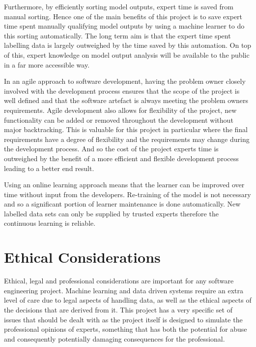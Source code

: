 \documentclass{ecmm427_assignment}
\begin{document}
Furthermore, by efficiently sorting model outputs, expert time is saved from manual sorting. Hence one of the main benefits of this project is to save expert time spent manually qualifying model outputs by using a machine learner to do this sorting automatically. The long term aim is that the expert time spent labelling data is largely outweighed by the time saved by this automation. On top of this, expert knowledge on model output analysis will be available to the public in a far more accessible way.\par

In an agile approach to software development, having the problem owner closely involved with the development process ensures that the scope of the project is well defined and that the software artefact is always meeting the problem owners requirements. Agile development also allows for flexibility of the project, new functionality can be added or removed throughout the development without major backtracking. This is valuable for this project in particular where the final requirements have a degree of flexibility and the requirements may change during the development process. And so the cost of the project experts time is outweighed by the benefit of a more efficient and flexible development process leading to a better end result.\par

Using an online learning approach means that the learner can be improved over time without input from the developers. Re-training of the model is not necessary and so a significant portion of learner maintenance is done automatically. New labelled data sets can only be supplied by trusted experts therefore the continuous learning is reliable.\par

\section{Ethical Considerations}

Ethical, legal and professional considerations are important for any
software engineering project. Machine learning and data driven systems
require an extra level of care due to legal aspects of handling data,
as well as the ethical aspects of the decisions that are derived from
it. This project has a very specific set of issues that should be
dealt with as the project itself is designed to simulate the professional
opinions of experts, something that has both the potential for abuse
and consequently potentially damaging consequences for the professional. 
\end{document}

